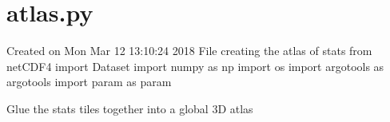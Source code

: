 \documentclass[letterpaper,10pt,english]{sphinxmanual}
\begin{document}
\section{atlas.py}
\label{\detokenize{pargopy:atlas-py}}\label{\detokenize{pargopy:module-pargopy.atlas}}
Created on Mon Mar 12 13:10:24 2018
File creating the atlas of stats
from netCDF4  import Dataset
import numpy as np
import os
import argotools as argotools
import param as param

\begin{fulllineitems}
\label{\detokenize{pargopy:pargopy.atlas.atlas_filename}}
\end{fulllineitems}


\begin{fulllineitems}
\label{\detokenize{pargopy:pargopy.atlas.get_glo_grid}}
\end{fulllineitems}


\begin{fulllineitems}
\label{\detokenize{pargopy:pargopy.atlas.glue_tiles}}
Glue the stats tiles together into a global 3D atlas

\end{fulllineitems}


\begin{fulllineitems}
\label{\detokenize{pargopy:pargopy.atlas.gridindex2lonlat}}
\end{fulllineitems}


\begin{fulllineitems}
\label{\detokenize{pargopy:pargopy.atlas.ij2tile}}
\end{fulllineitems}
\end{document}
